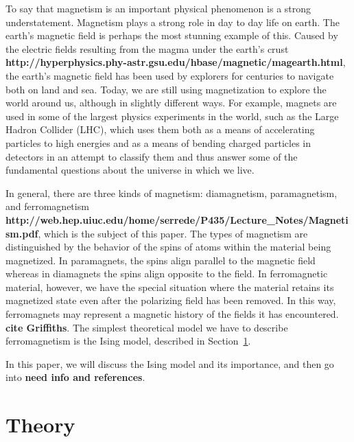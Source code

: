 \documentclass[12pt]{article}
\numberwithin{equation}{section}
\begin{document}
To say that magnetism is an important physical phenomenon is a strong understatement.  Magnetism plays a strong role in day to day life on earth.  The earth's magnetic field is perhaps the most stunning example of this.  Caused by the electric fields resulting from the magma under the earth's crust \textbf{http://hyperphysics.phy-astr.gsu.edu/hbase/magnetic/magearth.html}, the earth's magnetic field has been used by explorers for centuries to navigate both on land and sea.  Today, we are still using magnetization to explore the world around us, although in slightly different ways.  For example, magnets are used in some of the largest physics experiments in the world, such as the Large Hadron Collider (LHC), which uses them both as a means of accelerating particles to high energies and as a means of bending charged particles in detectors in an attempt to classify them and thus answer some of the fundamental questions about the universe in which we live.
\par In general, there are three kinds of magnetism: diamagnetism, paramagnetism, and ferromagnetism \textbf{http://web.hep.uiuc.edu/home/serrede/P435/Lecture\_Notes/Magnetism.pdf}, which is the subject of this paper.  The types of magnetism are distinguished by the behavior of the spins of atoms within the material being magnetized.  In paramagnets, the spins align parallel to the magnetic field whereas in diamagnets the spins align opposite to the field.  In ferromagnetic material, however, we have the special situation where the material retains its magnetized state even after the polarizing field has been removed.  In this way, ferromagnets may represent a magnetic history of the fields it has encountered. \textbf{cite Griffiths}.  The simplest theoretical model we have to describe ferromagnetism is the Ising model, described in Section~\ref{sec:theory}.  
\par In this paper, we will discuss the Ising model and its importance, and then go into \textbf{need info and references}.

\section{Theory}
\label{sec:theory}
\end{document}
